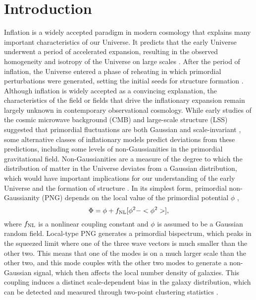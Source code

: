 \section{Introduction}
\label{sec:introduction}

Inflation is a widely accepted paradigm in modern cosmology that explains many important characteristics of our Universe. It predicts that the early Universe underwent a period of accelerated expansion, resulting in the observed homogeneity and isotropy of the Universe on large scales \citep[see, e.g.,][for a review]{weinberg2013observational}. After the period of inflation, the Universe entered a phase of reheating in which primordial perturbations were generated, setting the initial seeds for structure formation \citep{kofman1994reheating, bassett2006inflation, lyth2009primordial}. Although inflation is widely accepted as a convincing explanation, the characteristics of the field or fields that drive the inflationary expansion remain largely unknown in contemporary observational cosmology. While early studies of the cosmic microwave background (CMB) and large-scale structure (LSS) suggested that primordial fluctuations are both Gaussian and scale-invariant \citep{PhysRevD.69.103501, guth2005inflationary}, some alternative classes of inflationary models predict deviations from these predictions, including some levels of non-Gaussianities in the primordial gravitational field. Non-Gaussianities are a measure of the degree to which the distribution of matter in the Universe deviates from a Gaussian distribution, which would have important implications for our understanding of the early Universe and the formation of structure \citep[see, e.g.,][]{2010CQGra..27l4011D, Biagetti2019Galax...7...71B}. In its simplest form, primordial non-Gaussianity (PNG) depends on the local value of the primordial potential $\phi$ \citep{komatsu2001acoustic},
\begin{equation}
 \Phi = \phi + f_{\rm NL} [\phi^{2} - <\phi^{2}>],
\end{equation}
where $f_{\rm NL}$ is a nonlinear coupling constant and $\phi$ is assumed to be a Gaussian random field. Local-type PNG generates a primordial bispectrum, which peaks in the squeezed limit where one of the three wave vectors is much smaller than the other two. This means that one of the modes is on a much larger scale than the other two, and this mode couples with the other two modes to generate a non-Gaussian signal, which then affects the local number density of galaxies. This coupling induces a distinct scale-dependent bias in the galaxy distribution, which can be detected and measured through two-point clustering statistics \citep{dalal2008imprints}.

